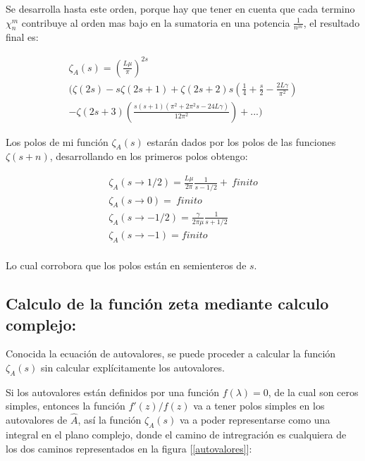 Se desarrolla hasta este orden, porque hay que tener en cuenta que cada termino $\chi _{n} ^{m} $ contribuye al orden mas bajo en la sumatoria en una potencia $\frac{1}{n ^m}$, el resultado final es:





\begin{equation}
\begin{array}{c}
    \zeta _A (s) = \left( \frac{L \mu }{\pi} \right) ^{2s} \\
	\Bigg(
		\zeta ( 2 s ) -
		s \zeta ( 2s+1 ) +
		 \zeta (2s +2 ) s \left( \frac{1}{4} + \frac{s}{2} - \frac{2 L  \gamma}{\pi ^2} \right)  \\
		 - \zeta (2s+3) \left(  
							\frac{s(s+1) ( \pi ^2 + 2 \pi ^2 s - 24 L \gamma)}{12 \pi ^2 }
		 					\right) 
		+ ...
		\Bigg)
\end{array}
\end{equation}


Los polos de mi función $\zeta _A (s)$ estarán dados por los polos de las funciones $\zeta (s+n)$, desarrollando en los primeros polos obtengo:

\begin{equation}
\begin{array}{c}
\zeta _A (s \rightarrow 1/2) = 
\frac{L \mu }{2 \pi } \frac{1}{s-1/2} + \ finito \\
\zeta _A (s \rightarrow 0) = \ finito \\
\zeta _A (s \rightarrow -1/2) = \frac{\gamma}{2 \pi \mu } \frac{1}{s+1/2} \\
\zeta _A (s \rightarrow -1) = finito \\
\end{array}
\end{equation}

Lo cual corrobora que los polos están en semienteros de $s$.

\subsection{Calculo de la función zeta mediante calculo complejo:}

Conocida la ecuación de autovalores, se puede proceder a calcular la función $\zeta _A (s) $ sin calcular explícitamente los autovalores.

Si los  autovalores están definidos por una función $f(\lambda ) = 0$, de la cual son ceros simples, entonces la función $f'(z) / f(z) $ va a tener polos simples en los autovalores de $\hat{A}$, así la  función $\zeta _A (s)$ va a poder representarse como una integral en el plano complejo, donde el camino de intregración es cualquiera de los dos caminos representados en la figura [\ref{autovalores}]:

